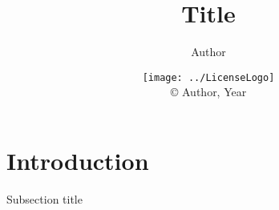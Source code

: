 

\title{Title}
\author{Author}
\date{\texttt{[image: ../LicenseLogo]}\\\copyright{} Author, Year}


	\frame{\titlepage}
	\section{Introduction}
	\begin{namedframe}{Subsection title}
	\end{namedframe}

